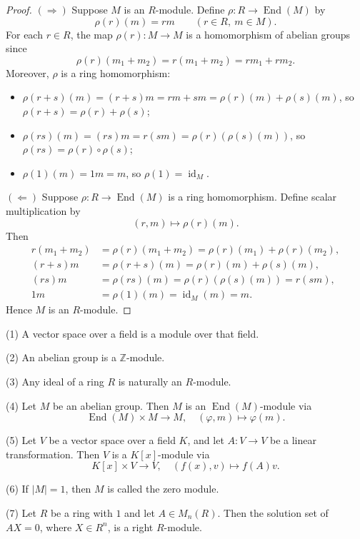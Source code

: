 \begin{proof}
    $(\Rightarrow)$ Suppose $M$ is an $R$-module. Define $\rho\colon R \to \operatorname{End}(M)$ by
    \[
        \rho(r)(m) = rm \qquad (r \in R,\ m \in M).
    \]
    For each $r \in R$, the map $\rho(r)\colon M \to M$ is a homomorphism of abelian groups since
    \[
        \rho(r)(m_1+m_2) = r(m_1+m_2) = rm_1 + rm_2.
    \]
    Moreover, $\rho$ is a ring homomorphism:
    \begin{itemize}
        \item $\rho(r+s)(m) = (r+s)m = rm + sm = \rho(r)(m) + \rho(s)(m)$, so $\rho(r+s) = \rho(r) + \rho(s)$;
        \item $\rho(rs)(m) = (rs)m = r(sm) = \rho(r)(\rho(s)(m))$, so $\rho(rs) = \rho(r) \circ \rho(s)$;
        \item $\rho(1)(m) = 1m = m$, so $\rho(1) = \operatorname{id}_M$.
    \end{itemize}

    $(\Leftarrow)$ Suppose $\rho\colon R \to \operatorname{End}(M)$ is a ring homomorphism. Define scalar multiplication by
    \[
        (r, m) \mapsto \rho(r)(m).
    \]
    Then
    \[
        \begin{aligned}
            r(m_1+m_2) & = \rho(r)(m_1+m_2) = \rho(r)(m_1) + \rho(r)(m_2), \\
            (r+s)m     & = \rho(r+s)(m) = \rho(r)(m) + \rho(s)(m),         \\
            (rs)m      & = \rho(rs)(m) = \rho(r)(\rho(s)(m)) = r(sm),      \\
            1m         & = \rho(1)(m) = \operatorname{id}_M(m) = m.
        \end{aligned}
    \]
    Hence $M$ is an $R$-module.
\end{proof}

\begin{example}
    (1) A vector space over a field is a module over that field.

    (2) An abelian group is a $\mathbb{Z}$-module.

    (3) Any ideal of a ring $R$ is naturally an $R$-module.

    (4) Let $M$ be an abelian group. Then $M$ is an $\operatorname{End}(M)$-module via
    \[
        \operatorname{End}(M) \times M \to M, \quad (\varphi, m) \mapsto \varphi(m).
    \]

    (5) Let $V$ be a vector space over a field $K$, and let $A\colon V \to V$ be a linear transformation. Then $V$ is a $K[x]$-module via
    \[
        K[x] \times V \to V, \quad (f(x), v) \mapsto f(A)v.
    \]

    (6) If $|M| = 1$, then $M$ is called the zero module.

    (7) Let $R$ be a ring with $1$ and let $A \in M_n(R)$. Then the solution set of $AX=0$, where $X \in R^n$, is a right $R$-module.
\end{example}

